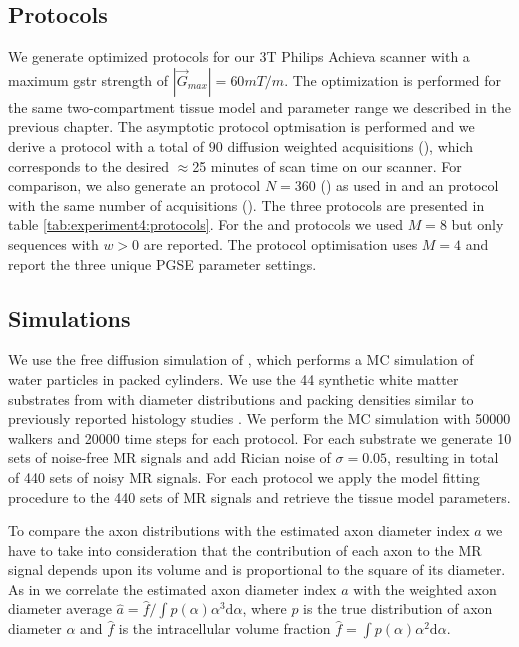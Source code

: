 \subsection*{Protocols}
We generate optimized protocols for our 3T Philips Achieva scanner with a maximum {\gls{gstr}} strength of $|\vec{G}_{max}|=60mT/m$. The \SFasym{} optimization is performed for the same two-compartment tissue model and parameter range we described in the previous chapter. The asymptotic \SFasym protocol optmisation is performed and we derive a protocol with a total of $90$ diffusion weighted acquisitions (\SFshort), which corresponds to the desired $\approx$25 minutes of scan time on our scanner. For comparison, we also generate an {\OI} protocol $N=360$ (\OIlong) as used in \citep{Alexander:2010} and an \SFasym protocol with the same number of acquisitions (\SFlong). The three protocols are presented in table \ref{tab:experiment4:protocols}. For the \SFshort{} and \SFlong{} protocols we used $M=8$ but only sequences with $w>0$ are reported. The \OIlong{} protocol optimisation uses $M=4$ and report the three unique {\gls{PGSE}} parameter settings.
\subsection*{Simulations}
We use the free diffusion simulation of \citet{Hall:2009}, which performs a \gls{MC} simulation of water particles in packed cylinders. We use the 44 synthetic white matter substrates from\citet{Alexander:2010} with diameter distributions and packing densities similar to previously reported histology studies \citep{GrafvonKeyserlingk:1984,LaMantia:1990,Aboitiz:1992}.%
We perform the MC simulation with 50000 walkers and 20000 time steps for each protocol. For each substrate we generate 10 sets of noise-free MR signals and add Rician noise of $\sigma=0.05$, resulting in  total of 440 sets of noisy MR signals. For each protocol we apply the model fitting procedure to the 440 sets of MR signals and retrieve the tissue model parameters.

To compare the axon distributions with the estimated axon diameter index $a$ we have to take into consideration that the contribution of each axon to the MR signal depends upon its volume and is proportional to the square of its diameter. As in \citet{Alexander:2010} we correlate the estimated axon diameter index $a$ with the weighted axon diameter average $\hat{a} = \hat{f} / \int p(\alpha)\alpha^3\mbox{d}\alpha$, where $p$ is the true distribution of axon diameter $\alpha$ and $\hat{f}$ is the intracellular volume fraction $\hat{f} = \int p(\alpha)\alpha^2\mbox{d}\alpha.$


